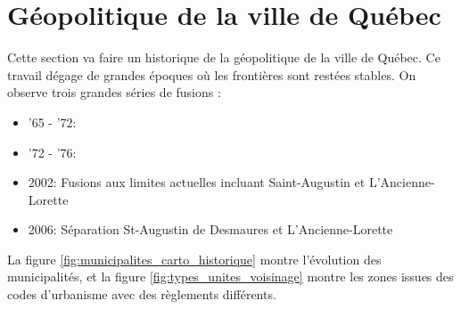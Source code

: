 \section{Géopolitique de la ville de Québec}\label{sec:geopolitique_quebec}
Cette section va faire un historique de la géopolitique de la ville de Québec. Ce travail dégage de grandes époques où les frontières sont restées stables. On observe trois grandes séries de fusions \parencite{ville_de_quebec_reperes_nodate}:
\begin{itemize}
  \item '65 - '72:
  \item '72 - '76:
  \item 2002: Fusions aux limites actuelles incluant  Saint-Augustin et L'Ancienne-Lorette
  \item 2006: Séparation St-Augustin de Desmaures et L'Ancienne-Lorette
\end{itemize}
\FloatBarrier
La figure \ref{fig:municipalites_carto_historique} montre l'évolution des municipalités, et la figure \ref{fig:types_unites_voisinage} montre les zones issues des codes d'urbanisme avec des règlements différents. 
